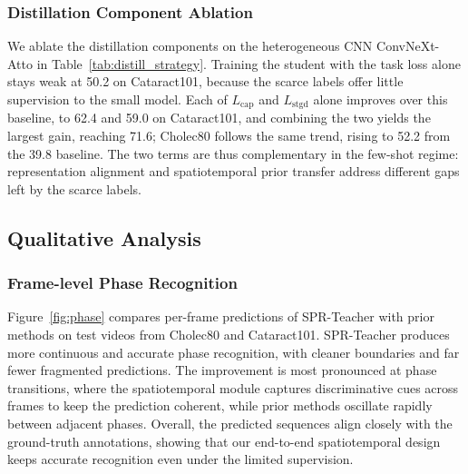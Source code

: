 


\subsubsection{Distillation Component Ablation}
We ablate the distillation components on the heterogeneous CNN ConvNeXt-Atto in
Table~\ref{tab:distill_strategy}. Training the student with the task loss alone
stays weak at 50.2 on Cataract101, because the scarce labels offer little supervision
to the small model. Each of $L_\mathrm{cap}$ and $L_\mathrm{stgd}$ alone improves
over this baseline, to 62.4 and 59.0 on Cataract101, and combining the two yields
the largest gain, reaching 71.6; Cholec80 follows the same trend, rising to 52.2
from the 39.8 baseline. The two terms are thus complementary in the few-shot
regime: representation alignment and spatiotemporal prior transfer address
different gaps left by the scarce labels.







\subsection{Qualitative Analysis}
\subsubsection{Frame-level Phase Recognition}
Figure~\ref{fig:phase} compares per-frame predictions of SPR-Teacher with prior
methods on test videos from Cholec80 and Cataract101.
SPR-Teacher produces more continuous and accurate phase recognition, with cleaner boundaries
and far fewer fragmented predictions.
The improvement is most pronounced at phase transitions, where the spatiotemporal
module captures discriminative cues across frames to keep the prediction coherent,
while prior methods oscillate rapidly between adjacent phases.
Overall, the predicted sequences align closely with the ground-truth annotations,
showing that our end-to-end spatiotemporal design keeps accurate recognition even
under the limited supervision.
%
